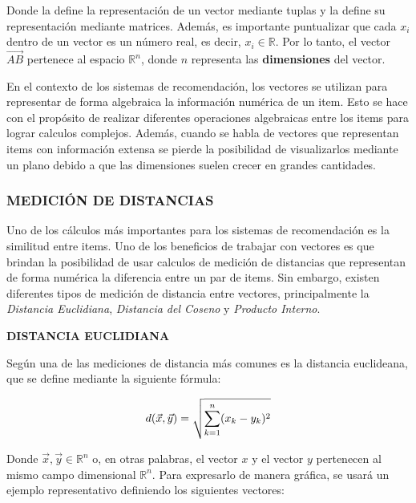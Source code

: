     Donde la  define la representación de un vector mediante tuplas y la  define su representación mediante matrices. Además, es importante puntualizar que cada $x_i$ dentro de un vector es un número real, es decir,  $x_i \in \mathbb{R}$. Por lo tanto, el vector $\vec{AB}$ pertenece al espacio $\mathbb{R}^n$, donde $n$ representa las \textbf{dimensiones} del vector.

    En el contexto de los sistemas de recomendación, los vectores se utilizan para representar de forma algebraica la información numérica de un item. Esto se hace con el propósito de realizar diferentes operaciones algebraicas entre los items para lograr calculos complejos. Además, cuando se habla de vectores que representan items con información extensa se pierde la posibilidad de visualizarlos mediante un plano debido a que las dimensiones suelen crecer en grandes cantidades.

    \newpage

    \subsubsection{MEDICIÓN DE DISTANCIAS}

    Uno de los cálculos más importantes para los sistemas de recomendación es la similitud entre items. Uno de los beneficios de trabajar con vectores es que brindan la posibilidad de usar calculos de medición de distancias que representan de forma numérica la diferencia entre un par de items. Sin embargo, existen diferentes tipos de medición de distancia entre vectores, principalmente la \textit{Distancia Euclidiana}, \textit{Distancia del Coseno} y \textit{Producto Interno}.

    \textbf{DISTANCIA EUCLIDIANA}

    Según \parencite{10.5555/1941884} una de las mediciones de distancia más comunes es la distancia euclideana, que se define mediante la siguiente fórmula:

    \begin{equation}
        d(\vec{x}, \vec{y}) = \sqrt{\sum^n_{k=1}(x_k - y_k)^2}
        \addequation{Definición de Distancia Euclideana}
    \end{equation}

    Donde $\vec{x}, \vec{y} \in \mathbb{R}^n$ o, en otras palabras, el vector $x$ y el vector $y$ pertenecen al mismo campo dimensional $\mathbb{R}^n$. Para expresarlo de manera gráfica, se usará un ejemplo representativo definiendo los siguientes vectores:



